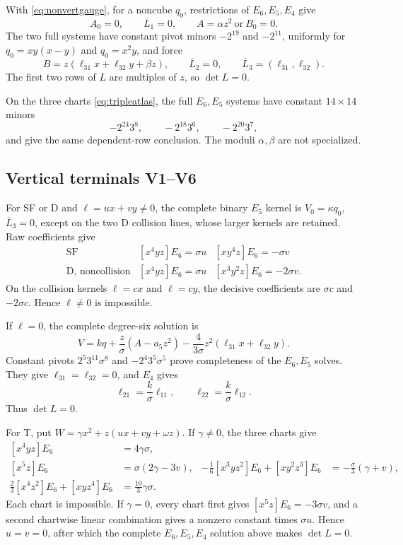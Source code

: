 \documentclass[11pt]{article}
\theoremstyle{remark}
\begin{document}
With \eqref{eq:nonvertgauge}, for a noncube $q_0$, restrictions of
$E_6,E_5,E_4$ give
\[
 A_0=0,\qquad\overline L_1=0,\qquad
 A=\alpha z^2\ \text{or}\ B_0=0.
\]
The two full systems have constant pivot minors $-2^{19}$ and $-2^{11}$,
uniformly for $q_0=xy(x-y)$ and $q_0=x^2y$, and force
\[
 B=z(\ell_{31}x+\ell_{32}y+\beta z),\qquad
 \overline L_2=0,\qquad
 \overline L_3=(\ell_{31},\ell_{32}).
\]
The first two rows of $L$ are multiples of $z$, so $\det L=0$.

On the three charts \eqref{eq:tripleatlas}, the full $E_6,E_5$ systems have
constant $14\times14$ minors
\[
 -2^{24}3^8,\qquad -2^{18}3^6,\qquad -2^{20}3^7,
\]
and give the same dependent-row conclusion.  The moduli $\alpha,\beta$ are
not specialized.

\subsection{Vertical terminals V1--V6}

For SF or D and $\ell=ux+vy\ne0$, the complete binary $E_5$ kernel is
$V_0=\kappa q_0$, $\overline L_3=0$, except on the two D collision
lines, whose larger kernels are retained.  Raw coefficients give
\[
\begin{array}{c|cc}
\text{SF}&[x^4yz]E_6=\sigma u&[xy^4z]E_6=-\sigma v\\
\text{D, noncollision}&[x^4yz]E_6=\sigma u&
[x^3y^2z]E_6=-2\sigma v.
\end{array}
\]
On the collision kernels $\ell=cx$ and $\ell=cy$, the decisive
coefficients are $\sigma c$ and $-2\sigma c$.  Hence $\ell\ne0$ is
impossible.

If $\ell=0$, the complete degree-six solution is
\[
 V=kq+\frac z\sigma(A-a_5z^2)
   -\frac4{3\sigma}z^2(\ell_{31}x+\ell_{32}y).
\]
Constant pivots $2^5 3^{11}\sigma^8$ and
$-2^4 3^5\sigma^5$ prove completeness of the $E_6,E_5$ solves.
They give $\ell_{31}=\ell_{32}=0$, and $E_4$ gives
\[
 \ell_{21}=\frac{k}{\sigma}\ell_{11},\qquad
 \ell_{22}=\frac{k}{\sigma}\ell_{12}.
\]
Thus $\det L=0$.

For T, put $W=\gamma x^2+z(ux+vy+\omega z)$.  If $\gamma\ne0$, the
three charts give
\[
\begin{aligned}
[x^4yz]E_6&=4\gamma\sigma,\\
[x^5z]E_6&=\sigma(2\gamma-3v),&
-\tfrac16[x^3yz^2]E_6+[xy^2z^3]E_6
  &=-\tfrac{\sigma}{3}(\gamma+v),\\
\tfrac23[x^4z^2]E_6+[xyz^4]E_6&=\tfrac{10}{3}\gamma\sigma .
\end{aligned}
\]
Each chart is impossible.  If $\gamma=0$, every chart first gives
$[x^5z]E_6=-3\sigma v$, and a second chartwise linear combination gives a
nonzero constant times $\sigma u$.  Hence $u=v=0$, after which the complete
$E_6,E_5,E_4$ solution above makes $\det L=0$.
\end{document}
